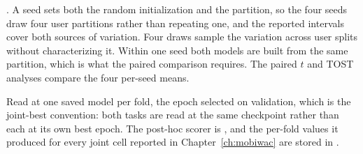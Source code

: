 \begin{description}
        . A seed
        sets both the random initialization and the partition, so the four seeds draw four
        user partitions rather than repeating one, and the reported intervals cover both
        sources of variation. Four draws sample the variation across user splits without
        characterizing it. Within one seed both models are built from the same partition, which is what
        the paired comparison requires. The paired $t$ and TOST analyses compare the four
        per-seed means.
  \item[The reported scores.] Read at one saved model per fold, the epoch selected on
        validation, which is the joint-best convention: both tasks are read at the same
        checkpoint rather than each at its own best epoch. The post-hoc scorer is
        , and the per-fold values it produced for
        every joint cell reported in Chapter~\ref{ch:mobiwac} are stored in
        .

\end{description}
